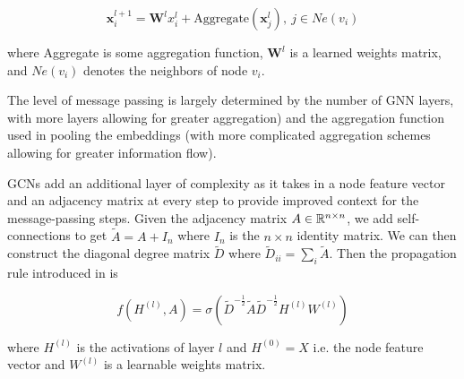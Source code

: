 \begin{equation}
\pmb{x}_i^{l+1} = \pmb{W}^{l}x_i^{l} + \text{Aggregate}(\pmb{x}_j^{l}),\ j \in Ne(v_i)
\end{equation}

where Aggregate is some aggregation function, $\pmb{W}^{l}$ is a learned weights matrix, and $Ne(v_i)$ denotes the neighbors of node $v_i$.

The level of message passing is largely determined by the number of GNN layers, with more layers allowing for greater aggregation) and the aggregation function used in pooling the embeddings (with more complicated aggregation schemes allowing for greater information flow).

GCNs add an additional layer of complexity as it takes in a node feature vector and an adjacency matrix at every step to provide improved context for the message-passing steps. Given the adjacency matrix $A \in \mathbb{R}^{n \times n}$, we add self-connections to get $\tilde{A} = A + I_n$ where $I_n$ is the $n \times n$ identity matrix. We can then construct the diagonal degree matrix $\tilde{D}$ where $\tilde{D}_{ii} = \sum_i\tilde{A}$. Then the propagation rule introduced in \cite{Kipf2017} is

\begin{equation}
f(H^{(l)}, A) = \sigma(\tilde{D}^{-\frac{1}{2}}\tilde{A}\tilde{D}^{-\frac{1}{2}}H^{(l)}W^{(l)})
\end{equation}

where $H^{(l)}$ is the activations of layer $l$ and $H^{(0)} = X$ i.e. the node feature vector and $W^{(l)}$ is a learnable weights matrix.


